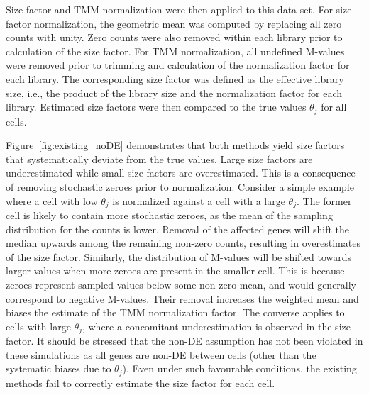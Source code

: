 \documentclass{article}
\begin{document}
Size factor and TMM normalization were then applied to this data set.
For size factor normalization, the geometric mean was computed by replacing all zero counts with unity.
Zero counts were also removed within each library prior to calculation of the size factor.
For TMM normalization, all undefined M-values were removed prior to trimming and calculation of the normalization factor for each library.
The corresponding size factor was defined as the effective library size, i.e., the product of the library size and the normalization factor for each library.
Estimated size factors were then compared to the true values $\theta_j$ for all cells.

Figure~\ref{fig:existing_noDE} demonstrates that both methods yield size factors that systematically deviate from the true values.
Large size factors are underestimated while small size factors are overestimated.
This is a consequence of removing stochastic zeroes prior to normalization.
Consider a simple example where a cell with low $\theta_j$ is normalized against a cell with a large $\theta_j$. 
The former cell is likely to contain more stochastic zeroes, as the mean of the sampling distribution for the counts is lower.
Removal of the affected genes will shift the median upwards among the remaining non-zero counts, resulting in overestimates of the size factor.
Similarly, the distribution of M-values will be shifted towards larger values when more zeroes are present in the smaller cell.
This is because zeroes represent sampled values below some non-zero mean, and would generally correspond to negative M-values.
Their removal increases the weighted mean and biases the estimate of the TMM normalization factor.
The converse applies to cells with large $\theta_j$, where a concomitant underestimation is observed in the size factor.
It should be stressed that the non-DE assumption has not been violated in these simulations as all genes are non-DE between cells (other than the systematic biases due to $\theta_j$).
Even under such favourable conditions, the existing methods fail to correctly estimate the size factor for each cell.
\end{document}
